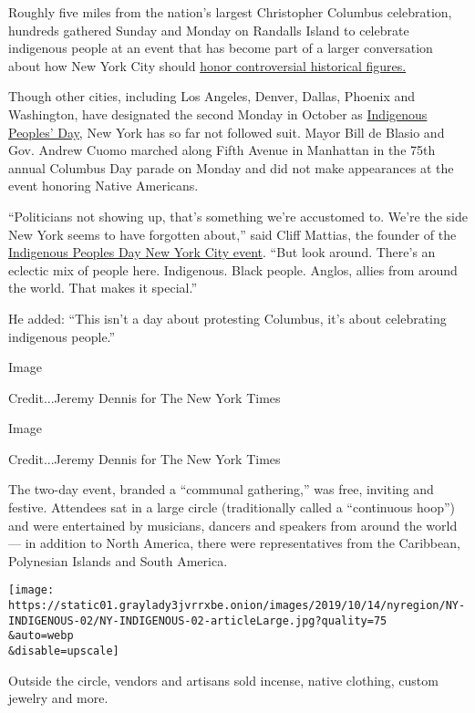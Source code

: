 Roughly five miles from the nation's largest Christopher Columbus
celebration, hundreds gathered Sunday and Monday on Randalls Island to
celebrate indigenous people at an event that has become part of a larger
conversation about how New York City should
\href{https://www.nytimes3xbfgragh.onion/2017/08/30/nyregion/ordering-review-of-statues-puts-de-blasio-in-tricky-spot.html?module=inline}{honor
controversial historical figures.}

Though other cities, including Los Angeles, Denver, Dallas, Phoenix and
Washington, have designated the second Monday in October as
\href{https://www.nytimes3xbfgragh.onion/2019/10/13/us/indigenous-peoples-day-columbus-day.html}{Indigenous
Peoples' Day}, New York has so far not followed suit. Mayor Bill de
Blasio and Gov. Andrew Cuomo marched along Fifth Avenue in Manhattan in
the 75th annual Columbus Day parade on Monday and did not make
appearances at the event honoring Native Americans.

``Politicians not showing up, that's something we're accustomed to.
We're the side New York seems to have forgotten about,'' said Cliff
Mattias, the founder of the \href{https://www.ipdnyc.org/}{Indigenous
Peoples Day New York City event}. ``But look around. There's an eclectic
mix of people here. Indigenous. Black people. Anglos, allies from around
the world. That makes it special.''

He added: ``This isn't a day about protesting Columbus, it's about
celebrating indigenous people.''

Image

Credit...Jeremy Dennis for The New York Times

Image

Credit...Jeremy Dennis for The New York Times

The two-day event, branded a ``communal gathering,'' was free, inviting
and festive. Attendees sat in a large circle (traditionally called a
``continuous hoop'') and were entertained by musicians, dancers and
speakers from around the world --- in addition to North America, there
were representatives from the Caribbean, Polynesian Islands and South
America.

\texttt{[image: https://static01.graylady3jvrrxbe.onion/images/2019/10/14/nyregion/NY-INDIGENOUS-02/NY-INDIGENOUS-02-articleLarge.jpg?quality=75\\\&auto=webp\\\&disable=upscale]}

Outside the circle, vendors and artisans sold incense, native clothing,
custom jewelry and more.


